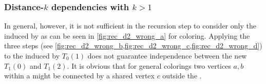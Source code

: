 	\subsubsection{Distance-$k$ dependencies with $k>1$}  \label{subsec:Dk_dependency}
In general, however, it is not sufficient in the recursion step to consider only the \subgraphs induced by \levelGroups as can be seen in \cref{fig:rec_d2_wrong_a} for \DTWO coloring. Applying  the three steps (see \cref{fig:rec_d2_wrong_b,fig:rec_d2_wrong_c,fig:rec_d2_wrong_d})  to  the \subgraph induced by $T_0(1)$ does not guarantee \DTWO independence between the new \levelGroups $T_1(0)$ and $T_1(2)$. It is obvious that for general \DK colorings two vertices $a,b$ within a \levelGroup might be connected by a shared vertex $c$ outside the \levelGroup. 
